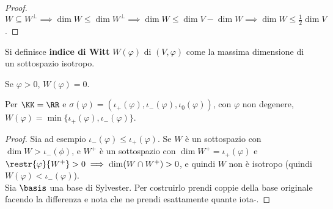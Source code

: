 \documentclass[11pt]{article}
\begin{document}
	\begin{proof}
		$W \subseteq W^\perp \implies \dim W \leq \dim W^\perp \implies
		\dim W \leq \dim V - \dim W \implies \dim W \leq \frac{1}{2} \dim V$.
	\end{proof}

	\begin{definition}
		Si definisce \textbf{indice di Witt} $W(\varphi)$ di $(V, \varphi)$
		come la massima dimensione di un sottospazio isotropo. 
	\end{definition}

	\begin{remark}\nl
		\li Se $\varphi > 0$, $W(\varphi) = 0$.
	\end{remark}

	\begin{proposition}
		Per $\KK = \RR$ e $\sigma(\varphi) = (\iota_+(\varphi), \iota_-(\varphi), \iota_0(\varphi))$, con $\varphi$ non degenere,
		$W(\varphi) = \min\{\iota_+(\varphi), \iota_-(\varphi)\}$.
	\end{proposition}

	\begin{proof}
		Sia ad esempio $\iota_-(\varphi) \leq \iota_+(\varphi)$. Se $W$
		è un sottospazio con $\dim W > \iota_-(\phi)$, e $W^+$ è
		un sottospazio con $\dim W^+ = \iota_+(\varphi)$ e $\restr{\varphi}{W^+} > 0 \implies \dim (W \cap W^+) > 0$,
		e quindi $W$ non è isotropo (quindi $W(\varphi) < \iota_-(\varphi)$). \\
		
		Sia $\basis$ una base di Sylvester. Per costruirlo prendi
		coppie della base originale facendo la differenza e nota
		che ne prendi esattamente quante iota-.
	\end{proof}
\end{document}
